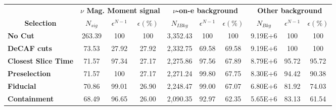 \begin{table}[!hb]
\begin{tabular}{|l|ccc|ccc|ccc|}\hline
\multicolumn{1}{|c|}{}                                     & \multicolumn{3}{c|}{\textbf{$\nu$ Mag. Moment signal}}          & \multicolumn{3}{c|}{\textbf{$\nu$-on-e background}}                      & \multicolumn{3}{c|}{\textbf{Other background}}                           \\
\multicolumn{1}{|c|}{\multirow{-2}{*}{\textbf{Selection}}} & \multicolumn{1}{c}{\textbf{$N_{sig}$}} & \textbf{$\epsilon^{N-1}$} & \textbf{$\epsilon \left(\%\right)$} & \multicolumn{1}{c}{\textbf{$N_{IBkg}$}} & \textbf{$\epsilon^{N-1}$} & \textbf{$\epsilon \left(\%\right)$} & \multicolumn{1}{c}{\textbf{$N_{Bkg}$}} & \textbf{$\epsilon^{N-1}$} & \textbf{$\epsilon \left(\%\right)$} \\\hline
\textbf{No Cut}                                          & 263.39                                 & 100       & 100       & 3,352.43                                         & 100       & 100       & 9.19E+6                                         & 100       & 100       \\
\textbf{DeCAF cuts}                                      & 73.53                                  & 27.92     & 27.92     & 2,332.75                                         & 69.58     & 69.58     & 9.19E+6 & 100       & 100       \\
\textbf{Closest Slice Time}                              & 71.57                                  & 97.34     & 27.17     & 2,275.86                                         & 97.56     & 67.89     & 8.79E+6                                         & 95.72     & 95.72     \\
\textbf{Preselection}                                    & 71.57                                  & 100       & 27.17     & 2,271.24                                         & 99.80     & 67.75     & 8.30E+6                                         & 94.42     & 90.38     \\
\textbf{Fiducial}                                        & 70.86                                  & 99.01     & 26.90     & 2,248.47                                         & 99.00     & 67.07     & 6.80E+6                                         & 81.92     & 74.03     \\
\textbf{Containment}                                     & 68.49                                  & 96.65     & 26.00     & 2,090.35                                         & 92.97     & 62.35     & 5.65E+6                                         & 83.13     & 61.54     \\

\end{tabular}
\end{table}
